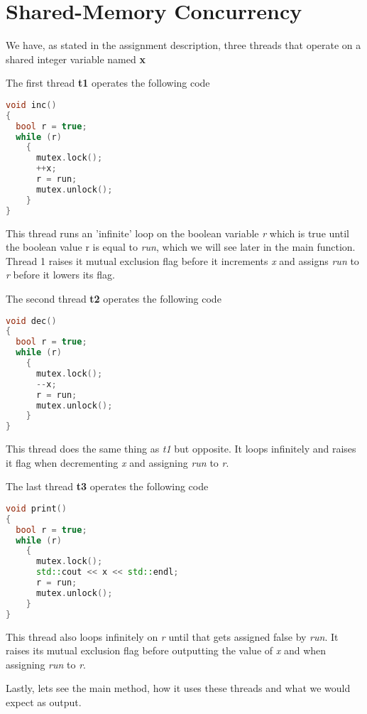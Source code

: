 \section{Shared-Memory Concurrency}

We have, as stated in the assignment description, three threads that 
operate on a shared integer variable named \textbf{x}

The first thread \textbf{t1} operates the following code

\begin{lstlisting}[language=C++, caption=Thread 1 source code]
void inc()
{
  bool r = true;
  while (r)
    {
      mutex.lock();
      ++x;
      r = run;
      mutex.unlock();
    }
}
\end{lstlisting}

This thread runs an 'infinite' loop on the boolean variable \textit{r} which is
true until the boolean value r is equal to \textit{run}, which we will see later
in the main function. Thread 1 raises it mutual exclusion flag before it increments
\textit{x} and assigns \textit{run} to \textit{r} before it lowers its flag.

The second thread \textbf{t2} operates the following code

\begin{lstlisting}[language=C++, caption=Thread 2 source code]
void dec()
{
  bool r = true;
  while (r)
    {
      mutex.lock();
      --x;
      r = run;
      mutex.unlock();
    }
}
\end{lstlisting}
This thread does the same thing as \textit{t1} but opposite. It loops infinitely
and raises it flag when decrementing \textit{x} and assigning \textit{run} to 
\textit{r}.  

The last thread \textbf{t3} operates the following code

\begin{lstlisting}[language=C++, caption=Thread 3 source code]
void print()
{
  bool r = true;
  while (r)
    {
      mutex.lock();
      std::cout << x << std::endl;
      r = run;
      mutex.unlock();
    }
}
\end{lstlisting}

This thread also loops infinitely on \textit{r} until that gets assigned false
by \textit{run}. It raises its mutual exclusion flag before outputting the value
of \textit{x} and when assigning \textit{run} to \textit{r}.

Lastly, lets see the main method, how it uses these threads and what we would
expect as output. 

